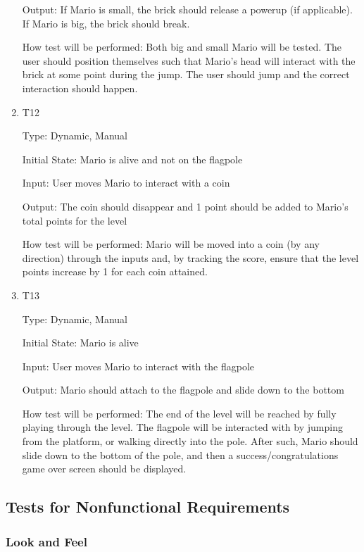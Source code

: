 \documentclass[12pt, titlepage]{article}
\begin{document}
\begin{enumerate}
Output: If Mario is small, the brick should release a powerup (if applicable). If Mario is big, the brick should break.
					
How test will be performed: Both big and small Mario will be tested. The user should position themselves such that Mario's head will interact with the brick at some point during the jump. The user should jump and the correct interaction should happen.

\item{T12\\}

Type: Dynamic, Manual
					
Initial State: Mario is alive and not on the flagpole
					
Input: User moves Mario to interact with a coin
					
Output: The coin should disappear and 1 point should be added to Mario's total points for the level
					
How test will be performed: Mario will be moved into a coin (by any direction) through the inputs and, by tracking the score, ensure that the level points increase by 1 for each coin attained.

\item{T13\\}

Type: Dynamic, Manual
					
Initial State: Mario is alive
					
Input: User moves Mario to interact with the flagpole
					
Output: Mario should attach to the flagpole and slide down to the bottom
					
How test will be performed: The end of the level will be reached by fully playing through the level. The flagpole will be interacted with by jumping from the platform, or walking directly into the pole. After such, Mario should slide down to the bottom of the pole, and then a success/congratulations game over screen should be displayed.

\end{enumerate}

\subsection{Tests for Nonfunctional Requirements}

\subsubsection{Look and Feel}
\end{document}
